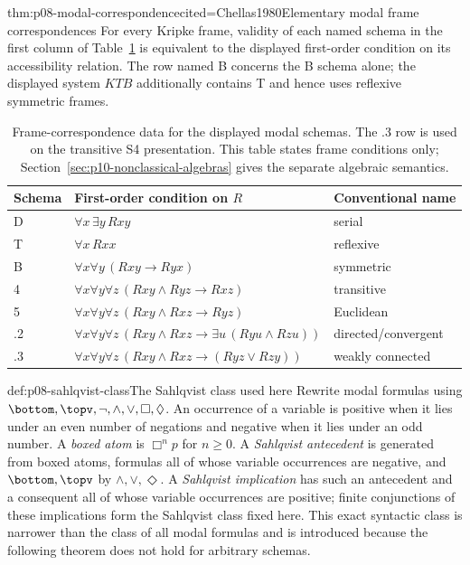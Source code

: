 \begin{hbtheorem}{thm:p08-modal-correspondence}{cited=Chellas1980}{Elementary modal frame correspondences}
For every Kripke frame, validity of each named schema in the first column of
Table~\ref{tab:p08-modal-correspondence} is equivalent to the displayed
first-order condition on its accessibility relation.  The row named B concerns
the B schema alone; the displayed system \(KTB\) additionally contains T and
hence uses reflexive symmetric frames.
\end{hbtheorem}

\begin{table}[!htbp]
\centering
\small
\begin{tabular}{@{}lll@{}}
\toprule
Schema & First-order condition on \(R\) & Conventional name \\
\midrule
D & \(\forall x\,\exists y\,Rxy\) & serial \\
T & \(\forall x\,Rxx\) & reflexive \\
B & \(\forall x\forall y\,(Rxy\to Ryx)\) & symmetric \\
4 & \(\forall x\forall y\forall z\,(Rxy\land Ryz\to Rxz)\) & transitive \\
5 & \(\forall x\forall y\forall z\,(Rxy\land Rxz\to Ryz)\) & Euclidean \\
.2 & \(\forall x\forall y\forall z\,
  (Rxy\land Rxz\to\exists u\,(Ryu\land Rzu))\) & directed/convergent \\
.3 & \(\forall x\forall y\forall z\,
  (Rxy\land Rxz\to(Ryz\lor Rzy))\) & weakly connected \\
\bottomrule
\end{tabular}
\caption{Frame-correspondence data for the displayed modal schemas.  The .3
row is used on the transitive S4 presentation.  This table states frame
conditions only; Section~\ref{sec:p10-nonclassical-algebras} gives the separate
algebraic semantics.}
\label{tab:p08-modal-correspondence}
\end{table}

\begin{hbdefinition}{def:p08-sahlqvist-class}{The Sahlqvist class used here}
Rewrite modal formulas using \(\bottom,\topv,\neg,\land,\lor,\Box,\Diamond\).
An occurrence of a variable is positive when it lies under an even number of
negations and negative when it lies under an odd number.  A \emph{boxed atom}
is \(\Box^n p\) for \(n\geq0\).  A \emph{Sahlqvist antecedent} is generated
from boxed atoms, formulas all of whose variable occurrences are negative,
and \(\bottom,\topv\) by \(\land,\lor,\Diamond\).  A \emph{Sahlqvist
implication} has such an antecedent and a consequent all of whose variable
occurrences are positive; finite conjunctions of these implications form the
Sahlqvist class fixed here.  This exact syntactic class is narrower than the
class of all modal formulas and is introduced because the following theorem
does not hold for arbitrary schemas.
\end{hbdefinition}


